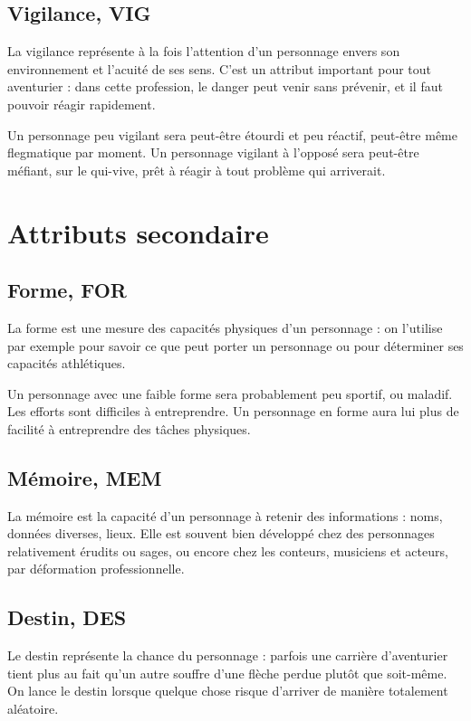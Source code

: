 \documentclass[10pt,a4paper,twocolumn]{book}
\begin{document}
\subsection{Vigilance, VIG}
La vigilance représente à la fois l'attention d'un personnage envers son environnement et l'acuité de ses sens. C'est un attribut important pour tout aventurier : dans cette profession, le danger peut venir sans prévenir, et il faut pouvoir réagir rapidement.

Un personnage peu vigilant sera peut-être étourdi et peu réactif, peut-être même flegmatique par moment. Un personnage vigilant à l'opposé sera peut-être méfiant, sur le qui-vive, prêt à réagir à tout problème qui arriverait.
\section{Attributs secondaire}
\subsection{Forme, FOR}
La forme est une mesure des capacités physiques d'un personnage : on l'utilise par exemple pour savoir ce que peut porter un personnage ou pour déterminer ses capacités athlétiques.

Un personnage avec une faible forme sera probablement peu sportif, ou maladif. Les efforts sont difficiles à entreprendre. Un personnage en forme aura lui plus de facilité à entreprendre des tâches physiques.
\subsection{Mémoire, MEM}
La mémoire est la capacité d'un personnage à retenir des informations : noms, données diverses, lieux. Elle est souvent bien développé chez des personnages relativement érudits ou sages, ou encore chez les conteurs, musiciens et acteurs, par déformation professionnelle.
\subsection{Destin, DES}
Le destin représente la chance du personnage : parfois une carrière d'aventurier tient plus au fait qu'un autre souffre d'une flèche perdue plutôt que soit-même. On lance le destin lorsque quelque chose risque d'arriver de manière totalement aléatoire.
\end{document}
